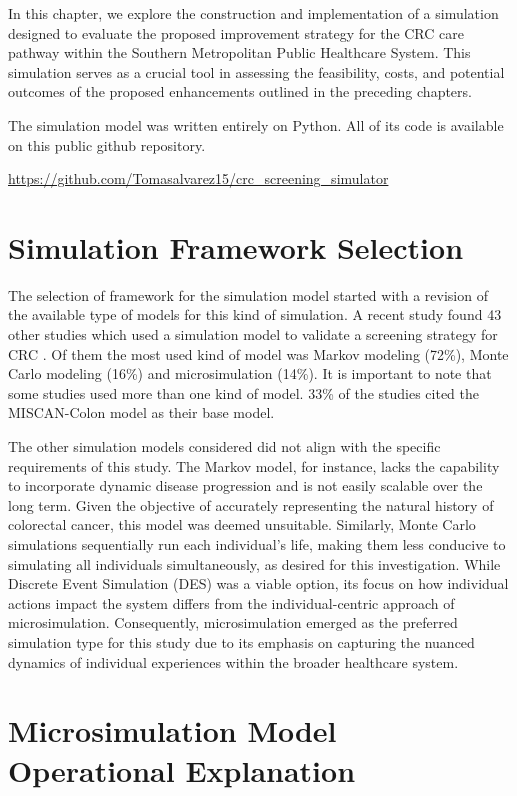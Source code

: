 In this chapter, we explore the construction and implementation of a simulation designed to evaluate the proposed improvement strategy for the CRC care pathway within the Southern Metropolitan Public Healthcare System. This simulation serves as a crucial tool in assessing the feasibility, costs, and potential outcomes of the proposed enhancements outlined in the preceding chapters.

The simulation model was written entirely on Python. All of its code is available on this public github repository.

\url{https://github.com/Tomasalvarez15/crc_screening_simulator}

\section{Simulation Framework Selection}

The selection of framework for the simulation model started with a revision of the available type of models for this kind of simulation. A recent study found 43 other studies which used a simulation model to validate a screening strategy for CRC \cite{smith_simulation_2020}. Of them the most used kind of model was Markov modeling (72\%), Monte Carlo modeling (16\%) and microsimulation (14\%). It is important to note that some studies used more than one kind of model. 33\% of the studies cited the MISCAN-Colon model \cite{loeve_miscan-colon_1999} as their base model.

The other simulation models considered did not align with the specific requirements of this study. The Markov model, for instance, lacks the capability to incorporate dynamic disease progression and is not easily scalable over the long term. Given the objective of accurately representing the natural history of colorectal cancer, this model was deemed unsuitable. Similarly, Monte Carlo simulations sequentially run each individual's life, making them less conducive to simulating all individuals simultaneously, as desired for this investigation. While Discrete Event Simulation (DES) was a viable option, its focus on how individual actions impact the system differs from the individual-centric approach of microsimulation. Consequently, microsimulation emerged as the preferred simulation type for this study due to its emphasis on capturing the nuanced dynamics of individual experiences within the broader healthcare system.

\section{Microsimulation Model Operational Explanation}

